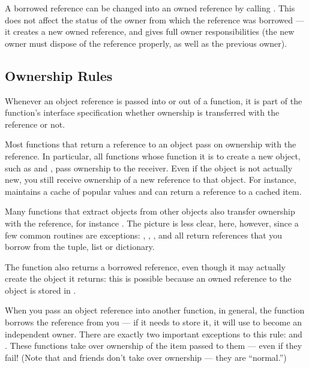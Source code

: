 A borrowed reference can be changed into an owned reference by calling
.  This does not affect the status of the owner from
which the reference was borrowed --- it creates a new owned reference,
and gives full owner responsibilities (the new owner must
dispose of the reference properly, as well as the previous owner).


\subsection{Ownership Rules
            \label{ownershipRules}}

Whenever an object reference is passed into or out of a function, it
is part of the function's interface specification whether ownership is
transferred with the reference or not.

Most functions that return a reference to an object pass on ownership
with the reference.  In particular, all functions whose function it is
to create a new object, such as  and
, pass ownership to the receiver.  Even if
the object is not actually new, you still receive ownership of a new
reference to that object.  For instance, 
maintains a cache of popular values and can return a reference to a
cached item.

Many functions that extract objects from other objects also transfer
ownership with the reference, for instance
.  The picture is less clear, here,
however, since a few common routines are exceptions:
, ,
, and 
all return references that you borrow from the tuple, list or
dictionary.

The function  also returns a borrowed
reference, even though it may actually create the object it returns:
this is possible because an owned reference to the object is stored in
.

When you pass an object reference into another function, in general,
the function borrows the reference from you --- if it needs to store
it, it will use  to become an independent
owner.  There are exactly two important exceptions to this rule:
 and .  These
functions take over ownership of the item passed to them --- even if
they fail!  (Note that  and friends don't
take over ownership --- they are ``normal.'')

